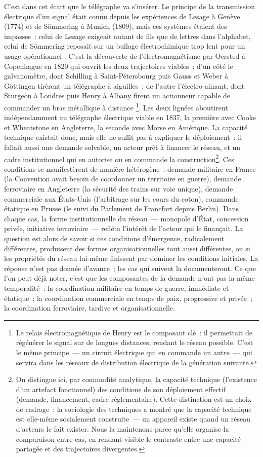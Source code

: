C'est dans cet écart que le télégraphe va s'insérer. Le principe de la transmission électrique d'un signal était connu depuis les expériences de Lesage à Genève (1774) et de Sömmering à Munich (1809), mais ces systèmes étaient des impasses~: celui de Lesage exigeait autant de fils que de lettres dans l'alphabet, celui de Sömmering reposait sur un bullage électrochimique trop lent pour un usage opérationnel \parencite{beauchamp2001telegraphy}. C'est la découverte de l'électromagnétisme par Oersted à Copenhague en 1820 qui ouvrit les deux trajectoires viables~: d'un côté le galvanomètre, dont Schilling à Saint-Pétersbourg puis Gauss et Weber à Göttingen tirèrent un télégraphe à aiguilles~; de l'autre l'électro-aimant, dont Sturgeon à Londres puis Henry à Albany firent un actionneur capable de commander un bras métallique à distance \parencite{kooij_telegraph_2015}\footnote{Le relais électromagnétique de Henry est le composant clé~: il permettait de régénérer le signal sur de longues distances, rendant le réseau possible. C'est le même principe~--- un circuit électrique qui en commande un autre~--- qui servira dans les réseaux de distribution électrique de la génération suivante.}. Les deux lignées aboutirent indépendamment au télégraphe électrique viable en 1837, la première avec Cooke et Wheatstone en Angleterre, la seconde avec Morse en Amérique. La capacité technique existait donc, mais elle ne suffit pas à expliquer le déploiement~: il fallait aussi une demande solvable, un acteur prêt à financer le réseau, et un cadre institutionnel qui en autorise ou en commande la construction\footnote{On distingue ici, par commodité analytique, la capacité technique (l'existence d'un artefact fonctionnel) des conditions de son déploiement effectif (demande, financement, cadre réglementaire). Cette distinction est un choix de cadrage~: la sociologie des techniques a montré que la capacité technique est elle-même socialement construite~--- un appareil existe quand un réseau d'acteurs le fait exister. Nous la maintenons parce qu'elle organise la comparaison entre cas, en rendant visible le contraste entre une capacité partagée et des trajectoires divergentes.}. Ces conditions se manifestèrent de manière hétérogène~: demande militaire en France (la Convention avait besoin de coordonner un territoire en guerre), demande ferroviaire en Angleterre (la sécurité des trains sur voie unique), demande commerciale aux États-Unis (l'arbitrage sur les cours du coton), commande étatique en Prusse (le suivi du Parlement de Francfort depuis Berlin). Dans chaque cas, la forme institutionnelle du réseau~--- monopole d'État, concession privée, initiative ferroviaire~--- refléta l'intérêt de l'acteur qui le finançait. La question est alors de savoir si ces conditions d'émergence, radicalement différentes, produisent des formes organisationnelles tout aussi différentes, ou si les propriétés du réseau lui-même finissent par dominer les conditions initiales. La réponse n'est pas donnée d'avance~; les cas qui suivent la documenteront. Ce que l'on peut déjà noter, c'est que les composantes de la demande n'ont pas la même temporalité~: la coordination militaire en temps de guerre, immédiate et étatique~; la coordination commerciale en temps de paix, progressive et privée~; la coordination ferroviaire, tardive et organisationnelle.

